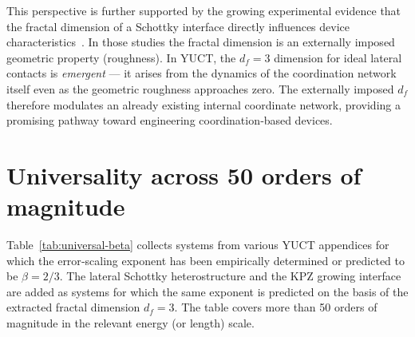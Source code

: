 \documentclass[12pt,a4paper]{article}
\begin{document}
	This perspective is further supported by the growing experimental
	evidence that the fractal dimension of a Schottky interface directly
	influences device characteristics~\cite{FractalSchottky}. In those
	studies the fractal dimension is an externally imposed geometric
	property (roughness). In YUCT, the $d_f = 3$ dimension for ideal
	lateral contacts is \emph{emergent} — it arises from the dynamics of
	the coordination network itself even as the geometric roughness
	approaches zero. The externally imposed $d_f$ therefore modulates an
	already existing internal coordinate network, providing a promising
	pathway toward engineering coordination‑based devices.
	
	\section{Universality across 50 orders of magnitude}
	Table~\ref{tab:universal-beta} collects systems from various YUCT
	appendices for which the error‑scaling exponent has been
	empirically determined or predicted to be $\beta = 2/3$. The
	lateral Schottky heterostructure and the KPZ growing interface are
	added as systems for which the same exponent is predicted on the
	basis of the extracted fractal dimension $d_f = 3$. The table covers
	more than 50 orders of magnitude in the relevant energy (or length)
	scale.
	
\end{document}
